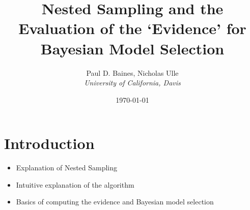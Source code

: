 \documentclass[11pt]{article}
\begin{document}
\title{Nested Sampling and the Evaluation of the \lq{}Evidence\rq{} for Bayesian Model Selection}
\author{
Paul D. Baines, Nicholas Ulle\\
\emph{University of California, Davis}
}
\date{\today}
\maketitle

\section{Introduction}\label{overview}

\begin{itemize}
 \item Explanation of Nested Sampling
 \item Intuitive explanation of the algorithm
 \item Basics of computing the evidence and Bayesian model selection
\end{itemize}
\end{document}
